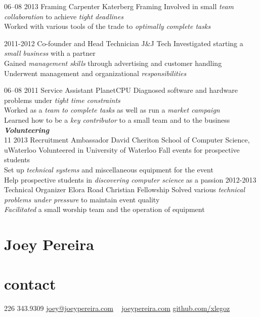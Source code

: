 \documentclass[]{friggeri-cv}
\newcommand{\imp}[1] {{\em #1}}
\begin{document}
\begin{entrylist}

  \entry
    {06–08 2013}
    {Framing Carpenter}
    {Katerberg Framing}
    {Involved in small \imp{team collaboration} to achieve \imp{tight deadlines} \\
    Worked with various tools of the trade to \imp{optimally complete tasks}  
   }

  \entry
  	{2011-2012}
  	{Co-founder and Head Technician}
  	{J\&J Tech}
  	{Investigated starting a \imp{small business} with a partner \\
	Gained \imp{management skills} through advertising and customer handling \\
	Underwent management and organizational \imp{responsibilities}}
	
  \entry
    {06–08 2011}
    {Service Assistant}
    {PlanetCPU}
    {Diagnosed software and hardware problems under \imp{tight time constraints} \\	Worked as a \imp{team to complete tasks} as well as run a \imp{market campaign} \\
    Learned how to be a \imp{key contributor} to a small team and to the business}
\textbf{\emph{Volunteering}} \\    
  \entry
  	{11 2013}
  	{Recruitment Ambassador}
  	{David Cheriton School of Computer Science, uWaterloo}
	{Volunteered in University of Waterloo Fall events for prospective students \\
  	Set up \imp{technical systems} and miscellaneous equipment for the event \\
	Help prospective students in \imp{discovering computer science} as a passion}
  \entry
  	{2012-2013}
  	{Technical Organizer}
  	{Elora Road Christian Fellowship}
	{Solved various \imp{technical problems under pressure} to maintain event quality\\
	\imp{Facilitated} a small worship team and the operation of equipment}
  	

\end{entrylist}

\newpage

\begin{asidetwo}  	
	\section{Joey Pereira}
	\section{contact}
    226 343.9309
    \href{mailto:joey@joeypereira.com}{joey@joeypereira.com}
    ~
    \href{http://joeypereira.com}{joeypereira.com}
    \href{http://www.github.com/xlegoz}{github.com/xlegoz}
\end{asidetwo}
\end{document}
